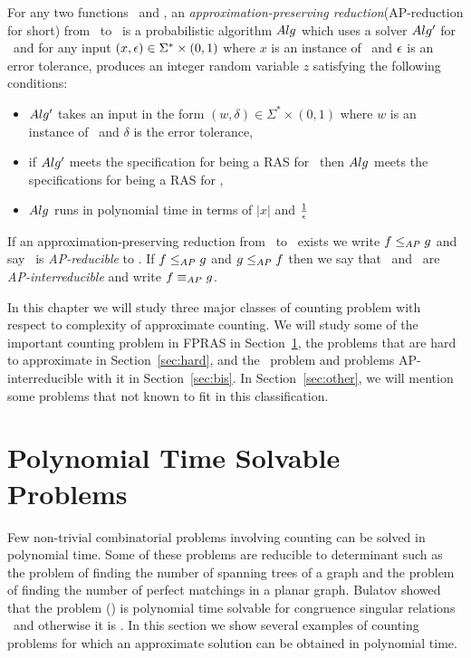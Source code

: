 \begin{defi}[AP-reduction]
For any two functions \mf\ and \mg, 
an \emph{approximation-preserving reduction}(AP-reduction for short)
from \mf\ to \mg\ is a probabilistic algorithm \(Alg\) which uses a solver
\(Alg'\) for \mg\ and for any input \((x,\epsilon) \in \Sigma^*\times(0,1)\) where \(x\)
is an instance of \mf\ and \(\epsilon\) is an error tolerance, produces an integer random variable \(z\)
satisfying the following  conditions: 
\begin{itemize}
\item \(Alg'\) takes an input in the form \((w,\delta) \in \Sigma^*\times(0,1)\)
where \(w\) is an instance of \mg\
and \(\delta\) is the error tolerance,
\item if \(Alg'\) meets the specification for being a RAS for 
\mg\ then \(Alg\) meets the specifications for being a RAS for \mf, 
\item \(Alg\) runs in polynomial time in terms of \(|x|\) and \(\frac{1}{\epsilon}\)
\end{itemize}
\end{defi}

If an approximation-preserving reduction from \mf\ to \mg\ exists we write \(f \le_{AP} g\)
and say \mf\ is \emph{AP-reducible} to \mg. If \(f \le_{AP} g\) and \(g \le_{AP} f\)
then we say that  \mf\ and \mg\ are \emph{AP-interreducible} and write \(f \equiv_{AP} g\)\@. 


In this chapter we will study three major classes of counting problem with respect
to complexity of approximate counting. We will study some of the important counting problem in FPRAS
in Section~\ref{sec:poly}, the problems that are hard to approximate in Section~\ref{sec:hard}, 
and the \cbis\ problem and problems AP-interreducible with it in Section~\ref{sec:bis}\@.
In Section~\ref{sec:other}, we will mention some problems that not known to fit in this classification.

\section{Polynomial Time Solvable Problems} \label{sec:poly}
Few non-trivial combinatorial problems involving counting 
can be solved in polynomial time.
Some of these problems are reducible to determinant such as
the problem of finding the number of spanning trees of a graph and 
the problem of finding the number of perfect matchings in a planar graph.
Bulatov \cite{Bulatov} showed that the problem \ccsp(\mrelset) is polynomial time solvable
for congruence singular relations \mrelset\ and otherwise it is \cpc\@.
In this section we show several
examples of counting problems for which an approximate solution can be obtained in polynomial time.

